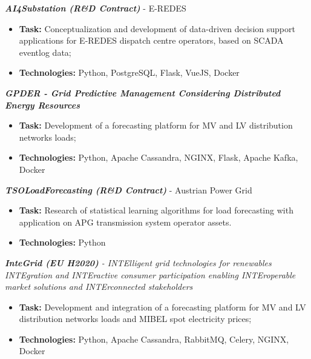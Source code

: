 \documentclass{mycv}
\begin{document}
\begin{myitemize}	

	\item \textit{\textbf{AI4Substation (R\&D Contract)}} - E-REDES
	\begin{itemize}
		\item \textbf{Task:} Conceptualization and development of data-driven decision support applications for E-REDES dispatch centre operators, based on SCADA eventlog data;
		\item \textbf{Technologies:} Python, PostgreSQL, Flask, VueJS, Docker
	\end{itemize}

	\vspace{0.30cm}	
	\item \textit{\textbf{GPDER - Grid Predictive Management Considering Distributed Energy Resources}}
	\begin{itemize}
		\item \textbf{Task:} Development of a forecasting platform for MV and LV distribution networks loads;
		\item \textbf{Technologies:} Python, Apache Cassandra, NGINX, Flask, Apache Kafka, Docker
	\end{itemize}

	\vspace{0.30cm}	
	\item \textit{\textbf{TSOLoadForecasting (R\&D Contract)}} - Austrian Power Grid
	\begin{itemize}
		\item \textbf{Task:} Research of statistical learning algorithms for load forecasting with  application on APG transmission system operator assets.
		\item \textbf{Technologies:} Python
	\end{itemize}
	
	\vspace{0.30cm}	
	\item \textit{\textbf{InteGrid (EU H2020)} - INTElligent grid technologies for renewables INTEgration and INTEractive consumer participation enabling INTEroperable market solutions and INTErconnected stakeholders}
	\begin{itemize}
		\item \textbf{Task:} Development and integration of a forecasting platform for MV and LV distribution networks loads and MIBEL spot electricity prices;
		\item \textbf{Technologies:} Python, Apache Cassandra, RabbitMQ, Celery, NGINX, Docker
	\end{itemize}


\end{myitemize}
\end{document}
